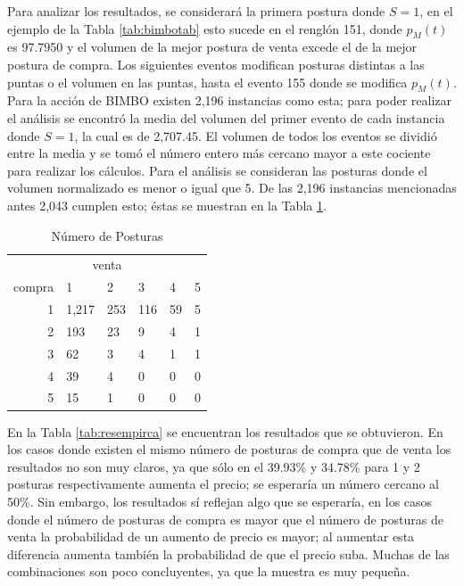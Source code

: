 \documentclass[11pt]{article}
\numberwithin{equation}{section} %
\begin{document}
Para analizar los resultados, se considerará la primera postura donde $S=1$, en el ejemplo de la Tabla \ref{tab:bimbotab} esto sucede en el renglón 151, donde $p_M(t)$ es 97.7950 y el volumen de la mejor postura de venta excede el de la mejor postura de compra. Los siguientes eventos modifican posturas distintas a las puntas o el volumen en las puntas, hasta el evento 155 donde se modifica $p_M(t)$.\\

Para la acción de BIMBO existen 2,196 instancias como esta; para poder realizar el análisis se encontró la media del volumen del primer evento de cada instancia donde $S=1$, la cual es de 2,707.45. El volumen de todos los eventos se dividió entre la media y se tomó el número entero más cercano mayor a este cociente para realizar los cálculos. Para el análisis se consideran las posturas donde el volumen normalizado es menor o igual que 5. De las 2,196 instancias mencionadas antes 2,043 cumplen esto; éstas se muestran en la Tabla \ref{tab:numempirca}.

\begin{table}[htbp]
\centering
\caption{Número de Posturas}
\begin{tabular}{r|p{1.5cm}|p{1.5cm}|p{1.5cm}|p{1.5cm}|p{1.5cm}|}
\multicolumn{6}{c}{venta}\\
\cline{2-6}
compra & 1& 2 & 3 & 4 & 5 \\
\cline{2-6}
1 & 1,217 & 253 & 116 & 59 & 5 \\
2 & 193 & 23 & 9 & 4 & 1 \\
3 & 62 & 3 & 4 & 1 & 1 \\
4 & 39 & 4 & 0 & 0 & 0 \\
5 & 15 & 1 & 0 & 0 & 0 \\
\cline{2-6}
\end{tabular}%
\label{tab:numempirca}%
\end{table}%

En la Tabla \ref{tab:resempirca} se encuentran los resultados que se obtuvieron. En los casos donde existen el mismo número de posturas de compra que de venta los resultados no son muy claros, ya que sólo en el 39.93\% y 34.78\% para 1 y 2 posturas respectivamente aumenta el precio; se esperaría un número cercano al 50\%. Sin embargo, los resultados sí reflejan algo que se esperaría, en los casos donde el número de posturas de compra es mayor que el número de posturas de venta la probabilidad de un aumento de precio es mayor; al aumentar esta diferencia aumenta también la probabilidad de que el precio suba. Muchas de las combinaciones son poco concluyentes, ya que la muestra es muy pequeña.
\end{document}
